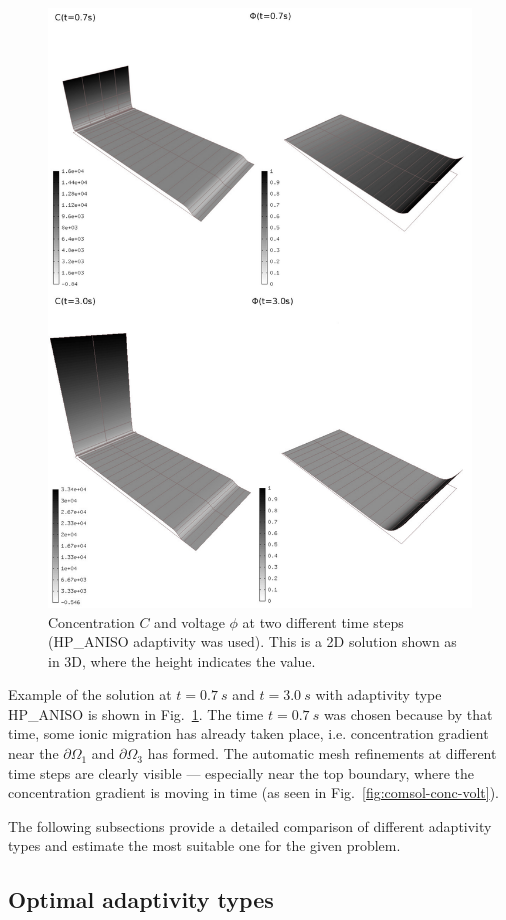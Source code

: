 \begin{figure}
  \begin{centering}
  \includegraphics[width=.75\columnwidth]{cphi}
  \caption{\label{fig:cphi} Concentration $C$
  and voltage $\phi$ at two different time steps
  (HP\_ANISO adaptivity was used). This is a 2D solution shown
  as in 3D, where the height indicates the value.}
  \end{centering}
\end{figure}
Example of the solution at $t=0.7\ s$ and $t=3.0\ s$ 
with adaptivity type HP\_ANISO is shown
in Fig.~\ref{fig:cphi}. The time $t=0.7\ s$ was chosen because
by that time, some ionic migration has already taken place, i.e.
concentration gradient near the $\partial\Omega_1$ and
$\partial\Omega_3$ has formed. The automatic mesh refinements
at different time steps are clearly visible --- especially
near the top boundary, where the concentration gradient is
moving in time (as seen in Fig.~\ref{fig:comsol-conc-volt}).

The following subsections provide a detailed comparison of
different adaptivity types and estimate the most suitable
one for the given problem.

\subsection{Optimal adaptivity types}

